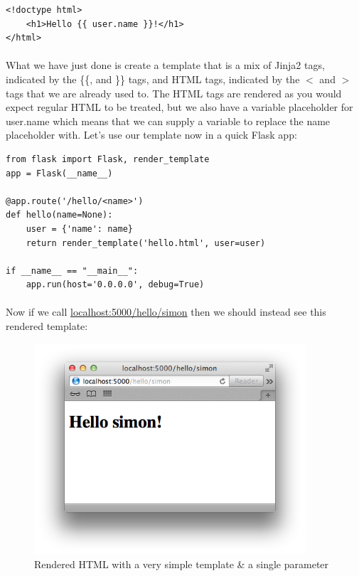\documentclass[12pt, a4paper, twoside]{book}
\begin{document}
\begin{lstlisting}
<!doctype html>
    <h1>Hello {{ user.name }}!</h1>
</html>
\end{lstlisting}

\paragraph{} What we have just done is create a template that is a mix of Jinja2 tags, indicated by the \{\{, and \}\} tags, and HTML tags, indicated by the $<$ and $>$ tags that we are already used to. The HTML tags are rendered as you would expect regular HTML to be treated, but we also have a variable placeholder for user.name which means that we can supply a variable to replace the name placeholder with. Let's use our template now in a quick Flask app:

\begin{lstlisting}
from flask import Flask, render_template
app = Flask(__name__)

@app.route('/hello/<name>')
def hello(name=None):
    user = {'name': name}
    return render_template('hello.html', user=user)

if __name__ == "__main__":
    app.run(host='0.0.0.0', debug=True)
\end{lstlisting}

\paragraph{} Now if we call \url{localhost:5000/hello/simon} then we should instead see this rendered template:

\begin{figure}[H]
\centering
\includegraphics[width=0.9\textwidth]{images/flask_template_basic}
\caption{Rendered HTML with a very simple template \& a single parameter}
\label{fig:flask_template_basic}
\end{figure}
\end{document}
